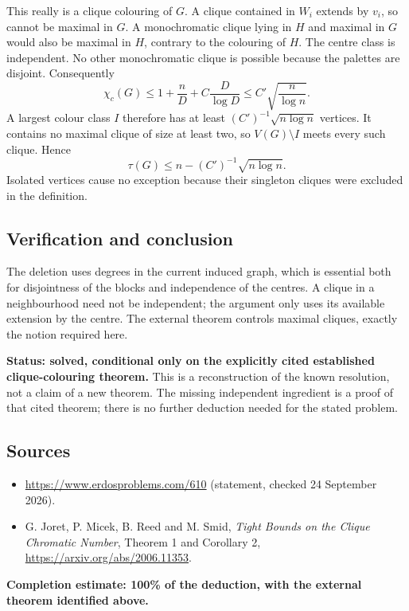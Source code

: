 This really is a clique colouring of $G$. A clique contained in $W_i$ extends by $v_i$, so cannot be maximal in $G$. A monochromatic clique lying in $H$ and maximal in $G$ would also be maximal in $H$, contrary to the colouring of $H$. The centre class is independent. No other monochromatic clique is possible because the palettes are disjoint. Consequently
\[
 \chi_c(G)\le 1+\frac nD+C\frac D{\log D}
          \le C'\sqrt{\frac n{\log n}}.
\]
A largest colour class $I$ therefore has at least $(C')^{-1}\sqrt{n\log n}$ vertices. It contains no maximal clique of size at least two, so $V(G)\setminus I$ meets every such clique. Hence
\[
 \boxed{\tau(G)\le n-(C')^{-1}\sqrt{n\log n}.}
\]
Isolated vertices cause no exception because their singleton cliques were excluded in the definition.

\subsection*{Verification and conclusion}
The deletion uses degrees in the current induced graph, which is essential both for disjointness of the blocks and independence of the centres. A clique in a neighbourhood need not be independent; the argument only uses its available extension by the centre. The external theorem controls maximal cliques, exactly the notion required here.

\textbf{Status: solved, conditional only on the explicitly cited established clique-colouring theorem.} This is a reconstruction of the known resolution, not a claim of a new theorem. The missing independent ingredient is a proof of that cited theorem; there is no further deduction needed for the stated problem.

\subsection*{Sources}
\begin{itemize}
\item \url{https://www.erdosproblems.com/610} (statement, checked 24 September 2026).
\item G. Joret, P. Micek, B. Reed and M. Smid, \emph{Tight Bounds on the Clique Chromatic Number}, Theorem 1 and Corollary 2, \url{https://arxiv.org/abs/2006.11353}.
\end{itemize}
\noindent\textbf{Completion estimate: 100\% of the deduction, with the external theorem identified above.}
